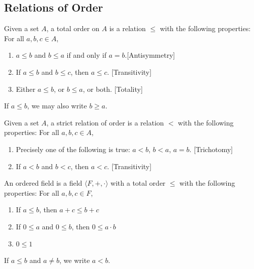 \documentclass[crop=false,class=book,oneside]{standalone}
\begin{document}
    \subsection{Relations of Order}
        \begin{definition}
            Given a set $A$, a total order on $A$ is a relation $\leq$ with the following properties: For all $a,b,c\in A$,
            \begin{enumerate}
                \item $a\leq b$ and $b\leq a$ if and only if $a=b$.\hfill [Antisymmetry]
                \item If $a\leq b$ and $b\leq c$, then $a\leq c$. \hfill [Transitivity]
                \item Either $a\leq b$, or $b\leq a$, or both. \hfill [Totality]
            \end{enumerate}
        \end{definition}
            \begin{remark}
            If $a\leq b$, we may also write $b\geq a$.
            \end{remark}
            \begin{definition}
            Given a set $A$, a strict relation of order is a relation $<$ with the following properties: For all $a,b,c\in A$,
            \begin{enumerate}
                \item Precisely one of the following is true: $a<b$, $b<a$, $a=b$. \hfill [Trichotomy]
                \item If $a<b$ and $b<c$, then $a<c$. \hfill [Transitivity]
            \end{enumerate}
            \end{definition}
            \begin{definition}
            An ordered field is a field $\langle F,+,\cdot \rangle$ with a total order $\leq$ with the following properties: For all $a,b,c\in F$,
            \begin{enumerate}
                \item If $a\leq b$, then $a+c\leq b+c$
                \item If $0 \leq a$ and $0\leq b$, then $0\leq a\cdot b$
                \item $0\leq 1$
            \end{enumerate}
            \end{definition}
            \begin{remark}
            If $a\leq b$ and $a\ne b$, we write $a<b$.
            \end{remark}
\end{document}
